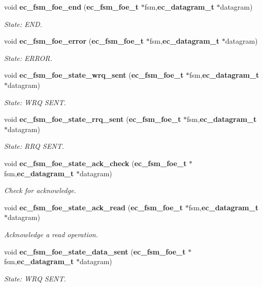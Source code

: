 \begin{DoxyCompactItemize}
void {\bf ec\-\_\-fsm\-\_\-foe\-\_\-end} ({\bf ec\-\_\-fsm\-\_\-foe\-\_\-t} $\ast$fsm,{\bf ec\-\_\-datagram\-\_\-t} $\ast$datagram)
\begin{DoxyCompactList}\small\item\em State\-: E\-N\-D. \end{DoxyCompactList}\item 
void {\bf ec\-\_\-fsm\-\_\-foe\-\_\-error} ({\bf ec\-\_\-fsm\-\_\-foe\-\_\-t} $\ast$fsm,{\bf ec\-\_\-datagram\-\_\-t} $\ast$datagram)
\begin{DoxyCompactList}\small\item\em State\-: E\-R\-R\-O\-R. \end{DoxyCompactList}\item 
void {\bf ec\-\_\-fsm\-\_\-foe\-\_\-state\-\_\-wrq\-\_\-sent} ({\bf ec\-\_\-fsm\-\_\-foe\-\_\-t} $\ast$fsm,{\bf ec\-\_\-datagram\-\_\-t} $\ast$datagram)
\begin{DoxyCompactList}\small\item\em State\-: W\-R\-Q S\-E\-N\-T. \end{DoxyCompactList}\item 
void {\bf ec\-\_\-fsm\-\_\-foe\-\_\-state\-\_\-rrq\-\_\-sent} ({\bf ec\-\_\-fsm\-\_\-foe\-\_\-t} $\ast$fsm,{\bf ec\-\_\-datagram\-\_\-t} $\ast$datagram)
\begin{DoxyCompactList}\small\item\em State\-: R\-R\-Q S\-E\-N\-T. \end{DoxyCompactList}\item 
void {\bf ec\-\_\-fsm\-\_\-foe\-\_\-state\-\_\-ack\-\_\-check} ({\bf ec\-\_\-fsm\-\_\-foe\-\_\-t} $\ast$fsm,{\bf ec\-\_\-datagram\-\_\-t} $\ast$datagram)
\begin{DoxyCompactList}\small\item\em Check for acknowledge. \end{DoxyCompactList}\item 
void {\bf ec\-\_\-fsm\-\_\-foe\-\_\-state\-\_\-ack\-\_\-read} ({\bf ec\-\_\-fsm\-\_\-foe\-\_\-t} $\ast$fsm,{\bf ec\-\_\-datagram\-\_\-t} $\ast$datagram)
\begin{DoxyCompactList}\small\item\em Acknowledge a read operation. \end{DoxyCompactList}\item 
void {\bf ec\-\_\-fsm\-\_\-foe\-\_\-state\-\_\-data\-\_\-sent} ({\bf ec\-\_\-fsm\-\_\-foe\-\_\-t} $\ast$fsm,{\bf ec\-\_\-datagram\-\_\-t} $\ast$datagram)
\begin{DoxyCompactList}\small\item\em State\-: W\-R\-Q S\-E\-N\-T. \end{DoxyCompactList}\item 

\end{DoxyCompactItemize}
